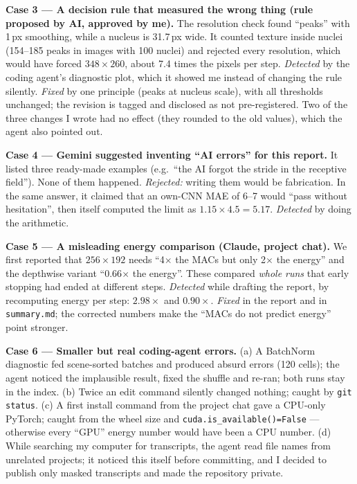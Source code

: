 \documentclass[11pt,a4paper]{article}
\begin{document}
\textbf{Case 3 --- A decision rule that measured the wrong thing (rule proposed by AI, approved by me).} The
resolution check found ``peaks'' with 1\,px smoothing, while a nucleus is 31.7\,px wide. It counted texture
inside nuclei (154--185 peaks in images with 100 nuclei) and rejected every resolution, which would have forced
$348\times260$, about 7.4 times the pixels per step. \emph{Detected} by the coding agent's diagnostic plot, which it
showed me instead of changing the rule silently. \emph{Fixed} by one principle (peaks at nucleus scale), with all
thresholds unchanged; the revision is tagged and disclosed as not pre-registered. Two of the three changes I wrote
had no effect (they rounded to the old values), which the agent also pointed out.

\textbf{Case 4 --- Gemini suggested inventing ``AI errors'' for this report.} It listed three ready-made examples
(e.g.\ ``the AI forgot the stride in the receptive field''). None of them happened. \emph{Rejected:} writing them
would be fabrication. In the same answer, it claimed that an own-CNN MAE of 6--7 would ``pass without hesitation'',
then itself computed the limit as $1.15\times4.5=5.17$. \emph{Detected} by doing the arithmetic.

\textbf{Case 5 --- A misleading energy comparison (Claude, project chat).} We first reported that $256\times192$
needs ``4$\times$ the MACs but only 2$\times$ the energy'' and the depthwise variant ``0.66$\times$ the energy''.
These compared \emph{whole runs} that early stopping had ended at different steps. \emph{Detected} while drafting
the report, by recomputing energy per step: $2.98\times$ and $0.90\times$. \emph{Fixed} in the report and in
\texttt{summary.md}; the corrected numbers make the ``MACs do not predict energy'' point stronger.

\textbf{Case 6 --- Smaller but real coding-agent errors.} (a) A BatchNorm diagnostic fed scene-sorted batches
and produced absurd errors (120 cells); the agent noticed the implausible result, fixed the shuffle and re-ran;
both runs stay in the index. (b) Twice an edit command silently changed nothing; caught by \texttt{git status}.
(c) A first install command from the project chat gave a CPU-only PyTorch; caught from the wheel size and
\texttt{cuda.is\_available()=False} --- otherwise every ``GPU'' energy number would have been a CPU number.
(d) While searching my computer for transcripts, the agent read file names from unrelated projects; it noticed
this itself before committing, and I decided to publish only masked transcripts and made the repository private.
\end{document}
